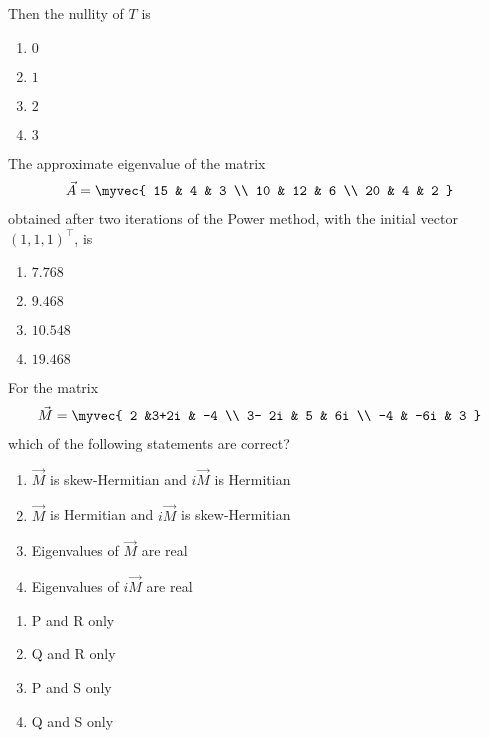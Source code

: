 Then the nullity of $T$ is
\hfill{}
\begin{multicols}{4}
\begin{enumerate}
  \item $0$
  \item $1$
  \item $2$
  \item $3$
\end{enumerate}
\end{multicols}
\item
The approximate eigenvalue of the matrix
\begin{align*}
\vec{A} = \myvec{
15 & 4 & 3 \\
10 & 12 & 6 \\
20 & 4 & 2
}
\end{align*}
obtained after two iterations of the Power method, with the initial vector $(1,1,1)^{\top}$, is
\hfill{}
\begin{multicols}{4}
\begin{enumerate}
  \item $7.768$
  \item $9.468$
  \item $10.548$
  \item $19.468$
\end{enumerate}
\end{multicols}
\item
For the matrix
\begin{align*}
    \vec{M} = \myvec{
	    2 &3+2i & -4 \\ 3- 2i & 5 & 6i \\ -4 & -6i & 3
}
\end{align*}
which of the following statements are correct?
\hfill{}
\begin{enumerate}[label=\Alph*., start=16]
\item $\vec{M}$ is skew-Hermitian and $i\vec{M}$ is Hermitian
\item $\vec{M}$ is Hermitian and $i\vec{M}$ is skew-Hermitian
\item Eigenvalues of $\vec{M}$ are real
\item Eigenvalues of $i\vec{M}$ are real
\end{enumerate}
\begin{multicols}{4}
\begin{enumerate}
\item P and R only
\item Q and R only
\item P and S only
\item Q and S only
\end{enumerate}
\end{multicols}
